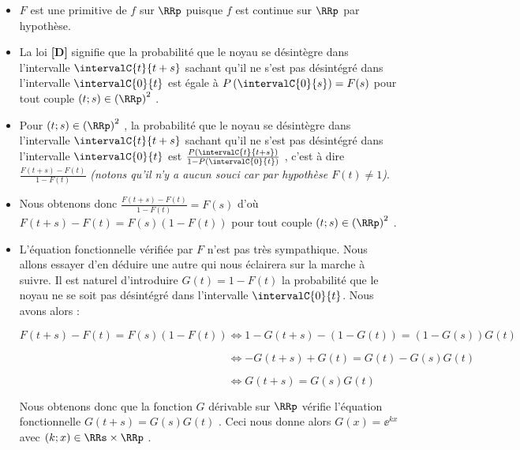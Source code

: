\begin{itemize}[label=\small\textbullet]
	\item  $F$ est une primitive de $f$ sur $\RRp$ puisque $f$ est continue sur $\RRp$ par hypothèse.

	


	\medskip
	\item La loi \textbf{[D]} signifie que la probabilité que le noyau se désintègre dans l'intervalle $\intervalC{t}{t + s}$ sachant qu'il ne s'est pas désintégré dans l'intervalle $\intervalC{0}{t}$ est égale à $P\left( \intervalC{0}{s} \right) = F(s)$ pour tout couple $(t ; s) \in \left( \RRp \right)^2$ .

	


	\medskip
	\item Pour $(t ; s) \in \left( \RRp \right)^2$ , la probabilité que le noyau se désintègre dans l'intervalle $\intervalC{t}{t + s}$ sachant qu'il ne s'est pas désintégré dans l'intervalle $\intervalC{0}{t}$ est 
	$\frac{P\left( \intervalC{t}{t+s} \right)}{1 - P\left( \intervalC{0}{t} \right)}$ ,
	c'est à dire
	$\frac{F(t+s) - F(t)}{1 - F(t)}$
	\emph{(notons qu'il n'y a aucun souci car par hypothèse $F(t) \neq 1$)}.

	


	\medskip
	\item Nous obtenons donc
	$\frac{F(t+s) - F(t)}{1 - F(t)} = F(s)$
	d'où
	$F(t+s) - F(t) = F(s) (1 - F(t))$
	pour tout couple $(t ; s) \in \left( \RRp \right)^2$ .

	


	\medskip
	\item L'équation fonctionnelle vérifiée par $F$ n'est pas très sympathique. Nous allons essayer d'en déduire une autre qui nous éclairera sur la marche à suivre.
	Il est naturel d'introduire $G(t) = 1 - F(t)$ la probabilité que le noyau ne se soit pas désintégré dans l'intervalle $\intervalC{0}{t}$. Nous avons alors :

	\medskip\noindent
	$F(t+s) - F(t) = F(s) (1 - F(t))
		\Longleftrightarrow 1 - G(t+s) - (1 - G(t)) = (1 - G(s)) G(t)$

	\smallskip\noindent
	$\phantom{F(t+s) - F(t) = F(s) (1 - F(t))}
		\Longleftrightarrow - G(t+s) + G(t) = G(t) - G(s) G(t)$

	\smallskip\noindent
	$\phantom{F(t+s) - F(t) = F(s) (1 - F(t))}
		\Longleftrightarrow G(t+s) = G(s) G(t)$
		
		
	\medskip\noindent
	Nous obtenons donc que la fonction $G$ dérivable sur $\RRp$ vérifie l'équation fonctionnelle $G(t+s) = G(s) G(t)$ .
	Ceci nous donne alors $G(x) = \ee^{kx}$ avec $(k ; x) \in \RRs \times \RRp$ .
	

\end{itemize}
